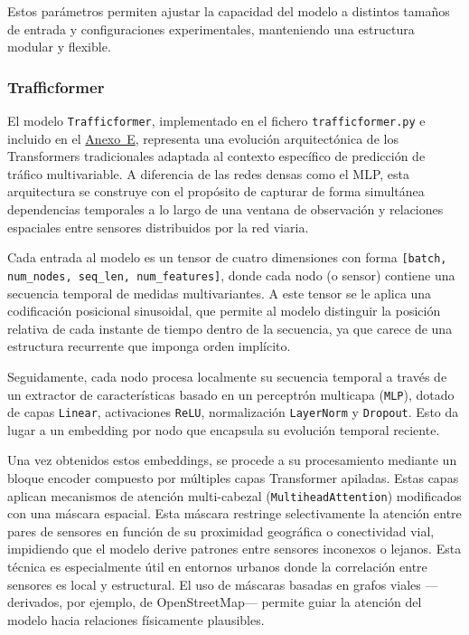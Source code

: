 Estos parámetros permiten ajustar la capacidad del modelo a distintos tamaños de entrada y configuraciones experimentales, manteniendo una estructura modular y flexible.

\subsubsection*{Trafficformer}

El modelo \texttt{Trafficformer}, implementado en el fichero \texttt{trafficformer.py} e incluido en el \hyperref[anexo:codigo_trafficformer]{Anexo~E}, representa una evolución arquitectónica de los Transformers tradicionales adaptada al contexto específico de predicción de tráfico multivariable. A diferencia de las redes densas como el MLP, esta arquitectura se construye con el propósito de capturar de forma simultánea dependencias temporales a lo largo de una ventana de observación y relaciones espaciales entre sensores distribuidos por la red viaria.

Cada entrada al modelo es un tensor de cuatro dimensiones con forma \texttt{[batch, num\_nodes, seq\_len, num\_features]}, donde cada nodo (o sensor) contiene una secuencia temporal de medidas multivariantes. A este tensor se le aplica una codificación posicional sinusoidal, que permite al modelo distinguir la posición relativa de cada instante de tiempo dentro de la secuencia, ya que carece de una estructura recurrente que imponga orden implícito.

Seguidamente, cada nodo procesa localmente su secuencia temporal a través de un extractor de características basado en un perceptrón multicapa (\texttt{MLP}), dotado de capas \texttt{Linear}, activaciones \texttt{ReLU}, normalización \texttt{LayerNorm} y \texttt{Dropout}. Esto da lugar a un embedding por nodo que encapsula su evolución temporal reciente.

Una vez obtenidos estos embeddings, se procede a su procesamiento mediante un bloque encoder compuesto por múltiples capas Transformer apiladas. Estas capas aplican mecanismos de atención multi-cabezal (\texttt{MultiheadAttention}) modificados con una máscara espacial. Esta máscara restringe selectivamente la atención entre pares de sensores en función de su proximidad geográfica o conectividad vial, impidiendo que el modelo derive patrones entre sensores inconexos o lejanos. Esta técnica es especialmente útil en entornos urbanos donde la correlación entre sensores es local y estructural. El uso de máscaras basadas en grafos viales —derivados, por ejemplo, de OpenStreetMap— permite guiar la atención del modelo hacia relaciones físicamente plausibles.


